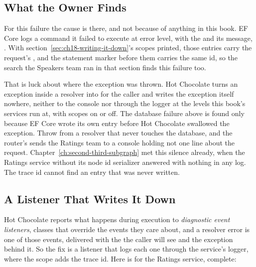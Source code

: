 \subsection{What the Owner Finds}

%
For this failure the cause is there, and not because of anything in this
book. EF Core logs a command it failed to execute at error level, with the
 and its message, . With
section~\ref{sec:ch18-writing-it-down}'s scopes printed, those entries carry the
request's , and the statement marker before them carries the
same id, so the search the Speakers team ran in that section finds this
failure too.

%
That is luck about where the exception was thrown. Hot Chocolate turns an
exception inside a resolver into  for the
caller and writes the exception itself nowhere, neither to the console nor
through the logger at the levels this book's services run at, with scopes on
or off. The database failure
above is found only because EF Core wrote its own entry before Hot Chocolate
swallowed the exception. Throw from a resolver that never touches the
database, and the router's  sends the Ratings team to a
console holding not one line about the request.
Chapter~\ref{ch:second-third-subgraph} met this silence already, when the
Ratings service without its node id serializer answered
 with nothing in any log. The trace id cannot
find an entry that was never written.

\subsection{A Listener That Writes It Down}

%
Hot Chocolate reports what happens during execution to \emph{diagnostic event
listeners}, classes that override the events they care about, and a resolver
error is one of those events, delivered with the  the caller will
see and the exception behind it. So the fix is a listener that logs each one
through the service's logger, where the scope adds the trace id. Here is
 for the Ratings service, complete:

